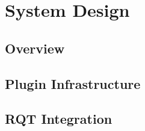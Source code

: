 \chapter{System Design}

\section{Overview}
\section{Plugin Infrastructure}
\section{RQT Integration}
